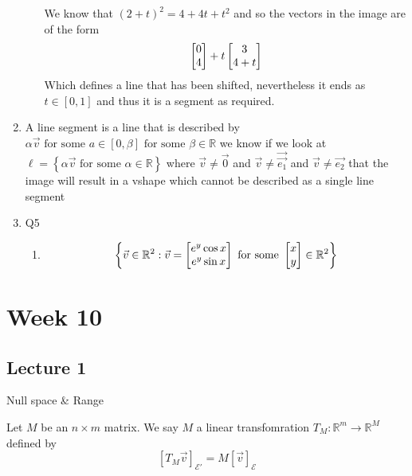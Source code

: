 \documentclass[11pt]{book}
\begin{document}
\begin{enumerate}
\begin{enumerate}
\[            \]
            We know that $\left( 2 + t \right) ^2 = 4 + 4t + t^2  $ and so the vectors in the image are of the form
            \[
            \begin{bmatrix} 0 \\ 4 \end{bmatrix}  + t \begin{bmatrix} 3 \\ 4 + t \end{bmatrix} 
            \]
            Which defines a line that has been shifted, nevertheless it ends as $t \in \left[ 0,1 \right] $ and thus it is a segment as required.
    \end{enumerate}
    \item A line segment is a line that is described by $\alpha \vec{v} \text{ for some  } a \in \left[ 0, \beta  \right] \text{ for some  } \beta \in \mathbb{R} $ we know if we look at $\ell= \left\{ \alpha \vec{v} \text{ for some  } \alpha \in \mathbb{R}   \right\} $ where $\vec{v} \neq \vec{0} $ and $\vec{v} \neq \vec{\vec{e_1} } $ and $\vec{v} \neq \vec{e_2} $ that the image will result in a vshape which cannot be described as a single line segment
    \item Q5
    \begin{enumerate}
        \item 
            \begin{gather*}
                \left\{ \vec{v} \in \mathbb{R}^2 : \vec{v} = \begin{bmatrix} e^{y} \cos{x} \\ e^{y} \sin{x} \end{bmatrix} \text{ for some  } \begin{bmatrix} x \\ y \end{bmatrix} \in \mathbb{R}^2   \right\} \\
            \end{gather*}
    \end{enumerate}
\end{enumerate}



\chapter{Week 10}%
\label{chp:week_10}

\section{Lecture 1}%
\label{sec:lecture_1}

Null space \& Range

\begin{defn}\label{defn:induced_transformation}
    Let $M$ be an $n \times m $ matrix. We say $M$  a linear transfomration $T_{M} : \mathbb{R}^{m} \to \mathbb{R}^{M}$ defined by 
    \begin{equation*}
        \left[ T_{M}\vec{v} \right]_{\mathcal{E'}} = M\left[ \vec{v} \right]_{\mathcal{E}}  
    \end{equation*}
\end{defn}
\end{document}
